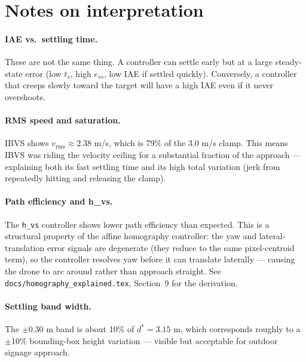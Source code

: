 \documentclass[11pt,a4paper]{article}
\begin{document}
\section{Notes on interpretation}

\paragraph{IAE vs.\ settling time.}
These are not the same thing.  A controller can settle early but at a large
steady-state error (low $t_s$, high $e_{ss}$, low IAE if settled quickly).
Conversely, a controller that creeps slowly toward the target will have a
high IAE even if it never overshoots.

\paragraph{RMS speed and saturation.}
IBVS shows $v_\mathrm{rms} \approx 2.38$ m/s, which is 79\% of the 3.0 m/s
clamp.  This means IBVS was riding the velocity ceiling for a substantial
fraction of the approach --- explaining both its fast settling time and its
high total variation (jerk from repeatedly hitting and releasing the clamp).

\paragraph{Path efficiency and h\_vs.}
The \texttt{h\_vs} controller shows lower path efficiency than expected.
This is a structural property of the affine homography controller: the
yaw and lateral-translation error signals are degenerate (they reduce to the
same pixel-centroid term), so the controller resolves yaw before it can
translate laterally --- causing the drone to arc around rather than approach
straight.  See \texttt{docs/homography\_explained.tex}, Section~9 for the
derivation.

\paragraph{Settling band width.}
The $\pm 0.30$ m band is about 10\% of $d^* = 3.15$ m, which corresponds
roughly to a $\pm$10\% bounding-box height variation --- visible but
acceptable for outdoor signage approach.
\end{document}
